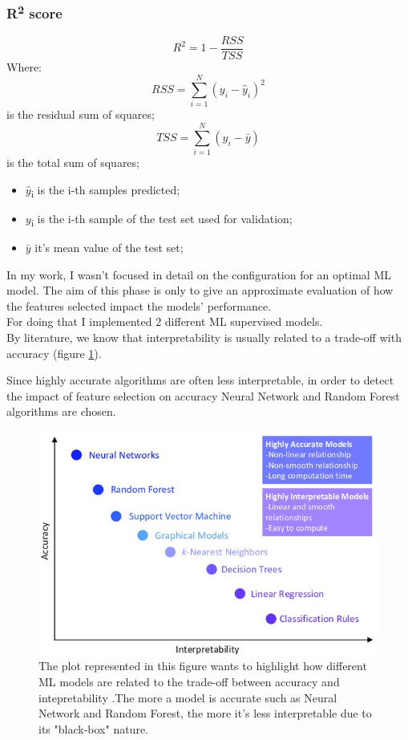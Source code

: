 \subsubsection{R\textsuperscript{2} score}
\begin{equation}
R^2 = 1 - \frac{RSS}{TSS}    
\end{equation}
Where:
\begin{equation}RSS = \sum_{i=1}^{N}(y_i-\hat{y}_i)^2 \end{equation}is the residual sum of squares;
\begin{equation} TSS =  \sum_{i=1}^{N}(y_i-\bar{y})\end{equation} is the total sum of squares;
\begin{itemize}
    \item $\hat{y}$\textsubscript{i} is the i-th samples predicted;
    \item $y$\textsubscript{i} is the i-th sample of the test set used for validation;
    \item $\bar{y}$ it's mean value of the test set;
\end{itemize}
\bigbreak\bigbreak
In my work, I wasn't focused in detail on the configuration for an optimal ML model. The aim of this phase is only to give an approximate evaluation of how the features selected impact the models' performance. \\
For doing that I implemented 2 different ML supervised models.\\
By literature, we know that interpretability is usually related to a trade-off with accuracy (figure \ref{fig:trade-off}).\par
Since highly accurate algorithms are often less interpretable, in order to detect the impact of feature selection on accuracy Neural Network and Random Forest algorithms are chosen. 
\begin{figure}[H]
    \centering
    \includegraphics[scale=1.4]{images/interpretability_accuracy_tradeoff.jpg}
    \caption{The plot represented in this figure wants to highlight how different ML models are related to the trade-off between accuracy and intepretability  \cite{morocho2019machine}.The more a model is accurate such as Neural Network and Random Forest, the more it's less interpretable due to its "black-box" nature.}
    \label{fig:trade-off}
\end{figure}
